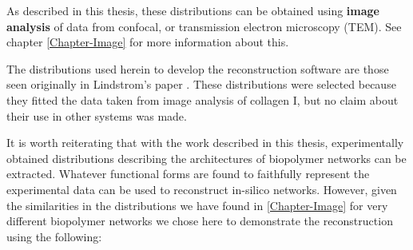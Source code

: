As described in this thesis, these distributions can be obtained using \textbf{image analysis} of data from
\gls{confocal}, or transmission electron microscopy (\gls{TEM}). See chapter \ref{Chapter-Image} for
more information about this.

The distributions used herein to develop the reconstruction software are those seen originally in
Lindstrom's paper \citep{lindstrom_biopolymer_2010}. These
distributions were selected because they fitted the data taken from image analysis of collagen I, but
no claim about their use in other systems was made.

It is worth reiterating that with the work described in this thesis, experimentally obtained distributions
describing the architectures of biopolymer networks can be extracted. Whatever functional forms are found to
faithfully represent the experimental data can be used to reconstruct in-silico networks. However, given the
similarities in the distributions we have found in \autoref{Chapter-Image} for very different biopolymer networks
we chose here to demonstrate the reconstruction using the following:


